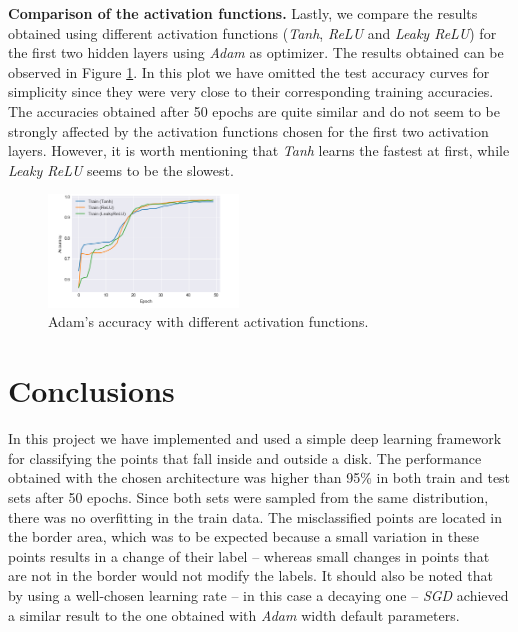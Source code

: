 \documentclass[10pt,conference,compsocconf]{IEEEtran}
\begin{document}
        

  
        \textbf{Comparison of the activation functions.}
        Lastly, we compare the results obtained using different activation functions (\textit{Tanh}, \textit{ReLU} and \textit{Leaky ReLU}) for the first two hidden layers using \textit{Adam} as optimizer. The results obtained can be observed in Figure \ref{fig:activ1comp}. In this plot we have omitted the test accuracy curves for simplicity since they were very close to their corresponding training accuracies. The accuracies obtained after 50 epochs are quite similar and do not seem to be strongly affected by the activation functions chosen for the first two activation layers. However, it is worth mentioning that \textit{Tanh} learns the fastest at first, while \textit{Leaky ReLU} seems to be the slowest.
        \begin{figure}[htp!]
            \centering
            \includegraphics[width=0.45\textwidth]{figures/activ1comp.png}
            \caption{Adam's accuracy with different activation functions.}
            \label{fig:activ1comp}
        \end{figure}

\section{Conclusions} %
\label{sec:summary}
	In this project we have implemented and used a simple deep learning framework for classifying the points that fall inside and outside a disk. The performance obtained with the chosen architecture was higher than 95\% in both train and test sets after 50 epochs. Since both sets were sampled from the same distribution, there was no overfitting in the train data. The misclassified points are located in the border area, which was to be expected because a small variation in these points results in a change of their label -- whereas small changes in points that are not in the border would not modify the labels. It should also be noted that by using a well-chosen learning rate -- in this case a decaying one -- \textit{SGD} achieved a similar result to the one obtained with \textit{Adam} width default parameters.



\end{document}
